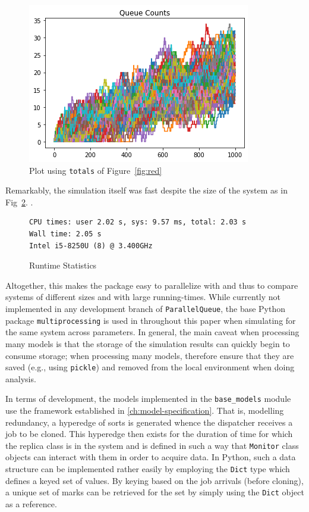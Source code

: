 \begin{figure}
    \centering
    \includegraphics[scale=0.8]{redundancy.png}
    \caption{Plot using \lstinline{totals} of Figure~\ref{fig:red}}
    \label{fig:redpic}
\end{figure}

Remarkably, the simulation itself was fast despite the size of the system as in Fig~\ref{fig:lstlisting2}.
.\begin{figure}
     \begin{lstlisting}
CPU times: user 2.02 s, sys: 9.57 ms, total: 2.03 s
Wall time: 2.05 s
Intel i5-8250U (8) @ 3.400GHz
     \end{lstlisting}
     \centering
     \caption{Runtime Statistics}
     \label{fig:lstlisting2}
\end{figure}


Altogether, this makes the package easy to parallelize with and thus to compare systems of different sizes
and with large running-times.
While currently not implemented in any development branch of \lstinline{ParallelQueue}, the base Python package
\lstinline{multiprocessing} is used in throughout this paper when simulating for the same system across parameters.
In general, the main caveat when processing many models is that the storage of the simulation results can quickly begin
to consume storage;
when processing many models, therefore ensure that they are saved (e.g., using \lstinline{pickle}) and removed from
the local environment when doing analysis.

In terms of development, the models implemented in the \lstinline{base_models} module use the framework established in
\ref{ch:model-specification}.
That is, modelling redundancy, a hyperedge of sorts is generated whence the dispatcher
receives a job to be cloned.
This hyperedge then exists for the duration of time for which the replica class is in the system and is defined in such
a way that \lstinline{Monitor} class objects can interact with them in order to acquire data.
In Python, such a data structure can be implemented rather easily by employing the \lstinline{Dict} type which defines
a keyed set of values.
By keying based on the job arrivals (before cloning), a unique set of marks can be retrieved for the set by simply using
the \lstinline{Dict} object as a reference.


